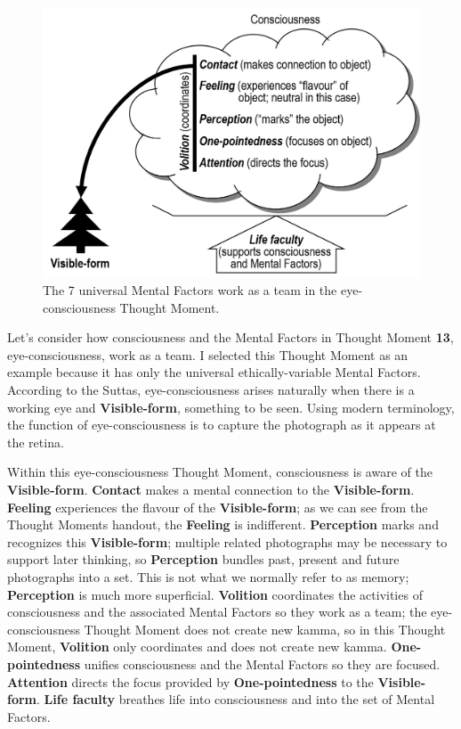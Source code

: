 \begin{figure}[h]
\centering
\includegraphics[width=0.7\linewidth]{./Diagrams/Eye-cons}
\caption{The 7 universal Mental Factors work as a team in the eye-consciousness Thought Moment.}
\label{fig:Eye-cons}
\end{figure}

Let’s consider how consciousness and the Mental Factors in Thought Moment \textbf{13}, eye-consciousness, work as a team. I selected this Thought Moment as an example because it has only the universal ethically-variable Mental Factors. According to the Suttas, eye-consciousness arises naturally when there is a working eye and \textbf{Visible-form}, something to be seen. Using modern terminology, the function of eye-consciousness is to capture the photograph as it appears at the retina.

Within this eye-consciousness Thought Moment, consciousness is aware of the \textbf{Visible-form}. \textbf{Contact} makes a mental connection to the \textbf{Visible-form}. \textbf{Feeling} experiences the flavour of the \textbf{Visible-form}; as we can see from the Thought Moments handout, the \textbf{Feeling} is indifferent. \textbf{Perception} marks and recognizes this \textbf{Visible-form}; multiple related photographs may be necessary to support later thinking, so \textbf{Perception} bundles past, present and future photographs into a set. This is not what we normally refer to as memory; \textbf{Perception} is much more superficial. \textbf{Volition} coordinates the activities of consciousness and the associated Mental Factors so they work as a team; the eye-consciousness Thought Moment does not create new kamma, so in this Thought Moment, \textbf{Volition} only coordinates and does not create new kamma. \textbf{One-pointedness} unifies consciousness and the Mental Factors so they are focused. \textbf{Attention} directs the focus provided by \textbf{One-pointedness} to the \textbf{Visible-form}. \textbf{Life faculty} breathes life into consciousness and into the set of Mental Factors.

